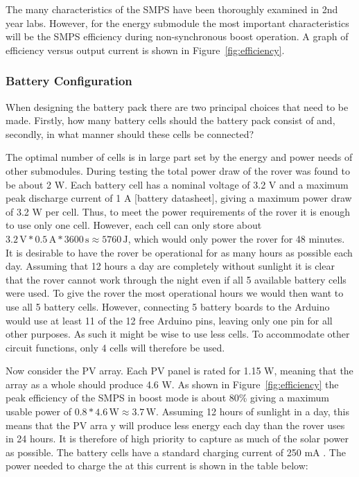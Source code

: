 \documentclass[a4paper]{article}
\newcommand{\unit}[1]{\ensuremath{\, \mathrm{#1}}}
\begin{document}
The many characteristics of the SMPS have been thoroughly examined in 
2nd year labs. However, for the energy submodule the most important characteristics 
will be the SMPS efficiency during non-synchronous boost operation. A graph of 
efficiency versus output current is shown in Figure~\ref{fig:efficiency}.


\subsubsection{Battery Configuration}




When designing the battery pack there are two principal choices that need to be made. 
Firstly, how many battery cells should the battery pack consist of and, secondly, 
in what manner should these cells be connected? 

The optimal number of cells is in large part set by the energy 
and power needs of other submodules. During testing the total power 
draw of the rover was found to be about 2 W. Each battery cell has a 
nominal voltage of 3.2 V and a maximum peak discharge current of 1 A 
[battery datasheet], giving a maximum power draw of 3.2 W per cell. 
Thus, to meet the power requirements of the rover it is enough to use only 
one cell. However, each cell can only store about \(3.2 \unit{V} * 0.5 \unit{A} * 3600 \unit{s} \approx 5760 \unit{J} \), 
which would only power the rover for 48 minutes. It is desirable to have 
the rover be operational for as many hours as possible each day. 
Assuming that 12 hours a day are completely without sunlight it is clear 
that the rover cannot work through the night even if all 5 available 
battery cells were used. To give the rover the most operational hours we 
would then want to use all 5 battery cells. However, connecting 5 battery 
boards to the Arduino would use at least 11 of the 12 free Arduino pins, 
leaving only one pin for all other purposes. As such it might be wise to use 
less cells. To accommodate other circuit functions, only 4 cells will therefore be used.

Now consider the PV array. Each PV panel is rated for 1.15 W, meaning 
that the array as a whole should produce 4.6 W. As shown in Figure~\ref{fig:efficiency} the 
peak efficiency of the SMPS in boost mode is about 80\% giving a maximum 
usable power of \(0.8 * 4.6 \unit{W} \approx 3.7 \unit{W} \). Assuming 12 hours of sunlight in a day, 
this means that the PV arra y will produce less energy each day than the rover 
uses in 24 hours. It is therefore of high priority to capture as much of the 
solar power as possible. The battery cells have a standard charging current of 
250 mA \cite{batteryDatasheet}. The power needed to charge the at this current is 
shown in the table below:
\end{document}
